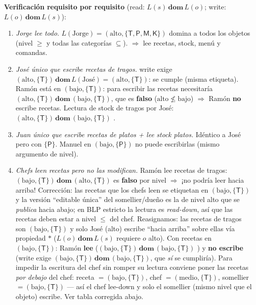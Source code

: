 \textbf{Verificación requisito por requisito} (read: $L(s)\,\mathbf{dom}\,L(o)$; write: $L(o)\,\mathbf{dom}\,L(s)$):
\begin{enumerate}
  \item \emph{Jorge lee todo.} $L(\text{Jorge})=(\mathrm{alto},\{\mathsf{T},\mathsf{P},\mathsf{M},\mathsf{K}\})$ domina a todos los objetos (nivel $\ge$ y todas las categorías $\subseteq$). $\Rightarrow$ lee recetas, stock, menú y comandas. \checkmark
  \item \emph{José único que escribe recetas de tragos.} write exige $(\mathrm{alto},\{\mathsf{T}\})\,\mathbf{dom}\,L(\text{José})=(\mathrm{alto},\{\mathsf{T}\})$: se cumple (misma etiqueta). Ramón está en $(\mathrm{bajo},\{\mathsf{T}\})$: para escribir las recetas necesitaría $(\mathrm{alto},\{\mathsf{T}\})\,\mathbf{dom}\,(\mathrm{bajo},\{\mathsf{T}\})$, que es \textbf{falso} ($\mathrm{alto}\not\le\mathrm{bajo}$) $\Rightarrow$ Ramón \textbf{no} escribe recetas. Lectura de stock de tragos por José: $(\mathrm{alto},\{\mathsf{T}\})\,\mathbf{dom}\,(\mathrm{bajo},\{\mathsf{T}\})$ \checkmark. \checkmark
  \item \emph{Juan único que escribe recetas de platos + lee stock platos.} Idéntico a José pero con $\{\mathsf{P}\}$. Manuel en $(\mathrm{bajo},\{\mathsf{P}\})$ no puede escribirlas (mismo argumento de nivel). \checkmark
  \item \emph{Chefs leen recetas pero no las modifican.} Ramón lee recetas de tragos: $(\mathrm{bajo},\{\mathsf{T}\})\,\mathbf{dom}\,(\mathrm{alto},\{\mathsf{T}\})$ es \textbf{falso} por nivel $\Rightarrow$ ¡no podría leer hacia arriba! Corrección: las recetas que los chefs leen se etiquetan en $(\mathrm{bajo},\{\mathsf{T}\})$ y la versión ``editable única'' del somellier/dueño es la de nivel alto que se \emph{publica} hacia abajo; en BLP estricto la lectura es \emph{read-down}, así que las recetas deben estar a nivel $\le$ del chef. Reasignamos: las recetas de tragos son $(\mathrm{bajo},\{\mathsf{T}\})$ y solo José (alto) escribe ``hacia arriba'' sobre ellas vía propiedad $\ast$ ($L(o)\,\mathbf{dom}\,L(s)$ requiere $o$ alto). Con recetas en $(\mathrm{bajo},\{\mathsf{T}\})$: Ramón \textbf{lee} ($(\mathrm{bajo},\{\mathsf{T}\})\,\mathbf{dom}\,(\mathrm{bajo},\{\mathsf{T}\})$ \checkmark) y \textbf{no escribe} (write exige $(\mathrm{bajo},\{\mathsf{T}\})\,\mathbf{dom}\,(\mathrm{bajo},\{\mathsf{T}\})$, que \emph{sí} se cumpliría). Para impedir la escritura del chef sin romper su lectura conviene poner las recetas \emph{por debajo} del chef: receta $=(\mathrm{bajo},\{\mathsf{T}\})$, chef $=(\mathrm{medio},\{\mathsf{T}\})$, somellier $=(\mathrm{bajo},\{\mathsf{T}\})$ — así el chef lee-down y solo el somellier (mismo nivel que el objeto) escribe. Ver tabla corregida abajo. \checkmark

\end{enumerate}
